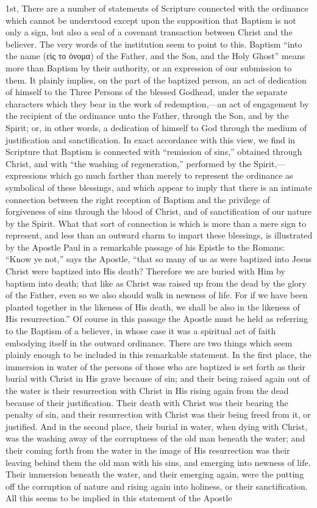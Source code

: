 \documentclass[]{book}
\begin{document}
1st, There are a number of statements of Scripture connected with the ordinance which cannot be understood except upon the supposition that Baptism is not only a sign, but also a seal of a covenant transaction between Christ and the believer. The very words of the institution seem to point to this. Baptism ``into the name (εἰς το ὀνομα) of the Father, and the Son, and the Holy Ghost'' means more than Baptism by their authority, or an expression of our submission to them. It plainly implies, on the part of the baptized person, an act of dedication of himself to the Three Persons of the blessed Godhead, under the separate characters which they bear in the work of redemption,---an act of engagement by the recipient of the ordinance unto the Father, through the Son, and by the Spirit; or, in other words, a dedication of himself to God through the medium of justification and sanctification. In exact accordance with this view, we find in Scripture that Baptism is connected with ``remission of sins,'' obtained through Christ, and with ``the washing of regeneration,'' performed by the Spirit,---expressions which go much farther than merely to represent the ordinance as symbolical of these blessings, and which appear to imply that there is an intimate connection between the right reception of Baptism and the privilege of forgiveness of sins through the blood of Christ, and of sanctification of our nature by the Spirit. What that sort of connection is which is more than a mere sign to represent, and less than an outward charm to impart these blessings, is illustrated by the Apostle Paul in a remarkable passage of his Epistle to the Romans: ``Know ye not,'' says the Apostle, ``that so many of us as were baptized into Jesus Christ were baptized into His death? Therefore we are buried with Him by baptism into death; that like as Christ was raised up from the dead by the glory of the Father, even so we also should walk in newness of life. For if we have been planted together in the likeness of His death, we shall be also in the likeness of His resurrection.'' Of course in this passage the Apostle must be held as referring to the Baptism of a believer, in whose case it was a spiritual act of faith embodying itself in the outward ordinance. There are two things which seem plainly enough to be included in this remarkable statement. In the first place, the immersion in water of the persons of those who are baptized is set forth as their burial with Christ in His grave because of sin; and their being raised again out of the water is their resurrection with Christ in His rising again from the dead because of their justification. Their death with Christ was their bearing the penalty of sin, and their resurrection with Christ was their being freed from it, or justified. And in the second place, their burial in water, when dying with Christ, was the washing away of the corruptness of the old man beneath the water; and their coming forth from the water in the image of His resurrection was their leaving behind them the old man with his sins, and emerging into newness of life. Their immersion beneath the water, and their emerging again, were the putting off the corruption of nature and rising again into holiness, or their sanctification. All this seems to be implied in this statement of the Apostle 
\end{document}
